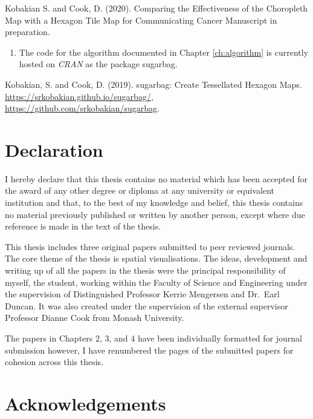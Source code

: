 \documentclass{monashthesis}
\begin{document}
Kobakian S. and Cook, D. (2020). Comparing the Effectiveness of the Choropleth Map with a Hexagon Tile Map for Communicating Cancer Manuscript in preparation.

\begin{enumerate}
\def\labelenumi{\arabic{enumi}.}
\setcounter{enumi}{3}
\tightlist
\item
  The code for the algorithm documented in Chapter \ref{ch:algorithm} is currently hosted on \emph{CRAN} as the package sugarbag.
\end{enumerate}

Kobakian, S. and Cook, D. (2019). sugarbag: Create Tessellated Hexagon Maps. \url{https://srkobakian.github.io/sugarbag/}, \url{https://github.com/srkobakian/sugarbag}.

\clearpage{}\setcounter{page}{0}

\hypertarget{declaration}{%
\chapter*{Declaration}\label{declaration}}

I hereby declare that this thesis contains no material which has been accepted for the award of any other degree or diploma at any university or equivalent institution and that, to the best of my knowledge and belief, this thesis contains no material previously published or written by another person, except where due reference is made in the text of the thesis.

This thesis includes three original papers submitted to peer reviewed journals. The core theme of the thesis is spatial visualisations. The ideas, development and writing up of all the papers in the thesis were the principal responsibility of myself, the student, working within the Faculty of Science and Engineering under the supervision of Distinguished Professor Kerrie Mengersen and Dr.~Earl Duncan. It was also created under the supervision of the external supervisor Professor Dianne Cook from Monash University.

The papers in Chapters 2, 3, and 4 have been individually formatted for journal submission however, I have renumbered the pages of the submitted papers for cohesion across this thesis.

\hypertarget{acknowledgements}{%
\chapter*{Acknowledgements}\label{acknowledgements}}
\end{document}
